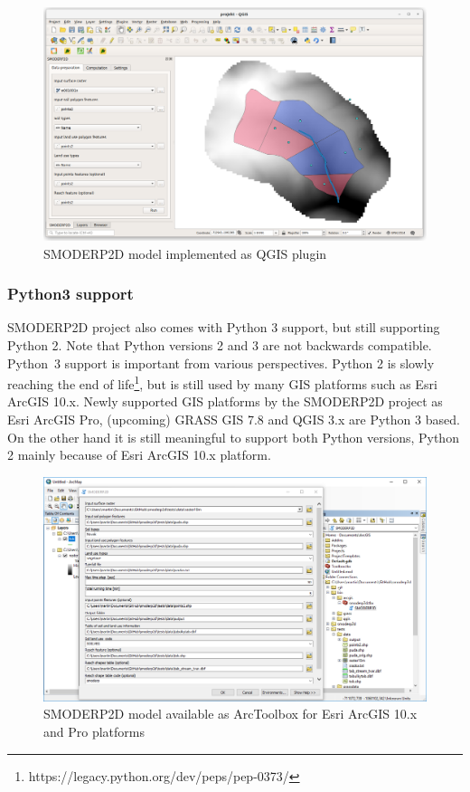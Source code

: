 \begin{figure}[ht!]
  \begin{center}
    \includegraphics[width=1.0\columnwidth]{figures/smoderp2d_qgis.png}
    \caption{SMODERP2D model implemented as QGIS plugin}
    \label{fig:smoderp2_qgis}
  \end{center}
\end{figure}

\subsubsection{Python3 support}
SMODERP2D project also comes with Python 3 support, but still
supporting Python 2. Note that Python versions 2 and 3 are not
backwards compatible.  Python~3 support is important from various
perspectives. Python 2 is slowly reaching the end of
life\footnote{https://legacy.python.org/dev/peps/pep-0373/}, but is still used by many GIS platforms such as Esri ArcGIS 10.x. Newly supported
GIS platforms by the SMODERP2D project as Esri ArcGIS Pro, (upcoming)
GRASS GIS 7.8 and QGIS 3.x are Python 3 based. On the other hand it is
still meaningful to support both Python versions, Python 2 mainly
because of Esri ArcGIS 10.x platform.

\begin{figure}[ht!]
  \begin{center}
    \includegraphics[width=1.0\columnwidth]{figures/smoderp2d_arcgis.png}
    \caption{SMODERP2D model available as ArcToolbox for Esri ArcGIS
      10.x and Pro platforms}
    \label{fig:smoderp2d_arcgis}
  \end{center}
\end{figure}
